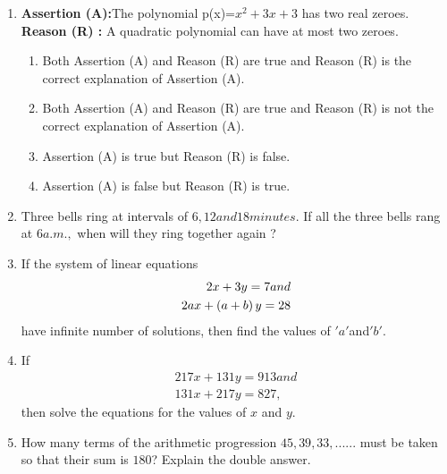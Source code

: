 \begin{enumerate}
\item \textbf{Assertion (A):}The polynomial p(x)=$x^{2}+3x+3$ has two real zeroes.
	\\\textbf{Reason (R) :} A quadratic polynomial can have at most two zeroes.
\begin{enumerate}
\item Both Assertion (A) and Reason (R) are true and Reason (R) is the correct explanation of Assertion (A). 
\item Both Assertion (A) and Reason (R) are true and Reason (R) is not the correct explanation of Assertion (A).
\item Assertion (A) is true but Reason (R) is false.
\item Assertion (A) is false but Reason (R) is true.
\end{enumerate}

\item Three bells ring at intervals of $ 6, 12 and 18 minutes$. If all the three bells rang at $ 6 a.m.,$ when will they ring together again ?

\item If the system of linear equations  \\ 		
\begin{align}
		2x + 3y = 7 and \\ 
		2ax + \left(a+b\right)y = 28
\end{align}
\text have infinite number of solutions, then find the values of $' a '$and$' b '$.

\item If
\begin{align}
	 217x + 131y = 913 and \\
         131x + 217y = 827,
\end{align}
 then solve the equations for the values of $x$ and $y$.

\item How many terms of the arithmetic progression $45,39,33,......$ must be taken so that their sum is $180$? Explain the double answer.
\end{enumerate}

